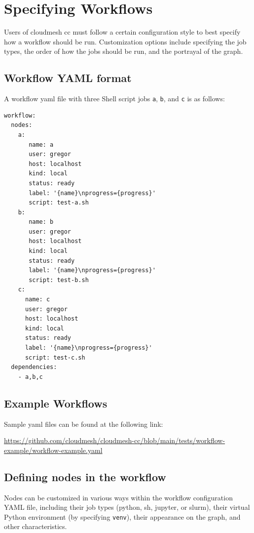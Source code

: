 \section{Specifying Workflows}\label{specifying-workflows}

Users of cloudmesh cc must follow a certain configuration style to best
specify how a workflow should be run. Customization options include
specifying the job types, the order of how the jobs should be run, and
the portrayal of the graph.

\subsection{Workflow YAML format}\label{workflow-yaml-format}

A workflow yaml file with three Shell script jobs \texttt{a},
\texttt{b}, and \texttt{c} is as follows:

\begin{verbatim}
workflow:
  nodes:
    a:
       name: a
       user: gregor
       host: localhost
       kind: local
       status: ready
       label: '{name}\nprogress={progress}'
       script: test-a.sh
    b:
       name: b
       user: gregor
       host: localhost
       kind: local
       status: ready
       label: '{name}\nprogress={progress}'
       script: test-b.sh
    c:
      name: c
      user: gregor
      host: localhost
      kind: local
      status: ready
      label: '{name}\nprogress={progress}'
      script: test-c.sh
  dependencies:
    - a,b,c
\end{verbatim}

\subsection{Example Workflows}\label{example-workflows}

Sample yaml files can be found at the following link:

\url{https://github.com/cloudmesh/cloudmesh-cc/blob/main/tests/workflow-example/workflow-example.yaml}

\subsection{Defining nodes in the
workflow}\label{defining-nodes-in-the-workflow}

Nodes can be customized in various ways within the workflow
configuration YAML file, including their job types (python, sh, jupyter,
or slurm), their virtual Python environment (by specifying
\texttt{venv}), their appearance on the graph, and other
characteristics.

